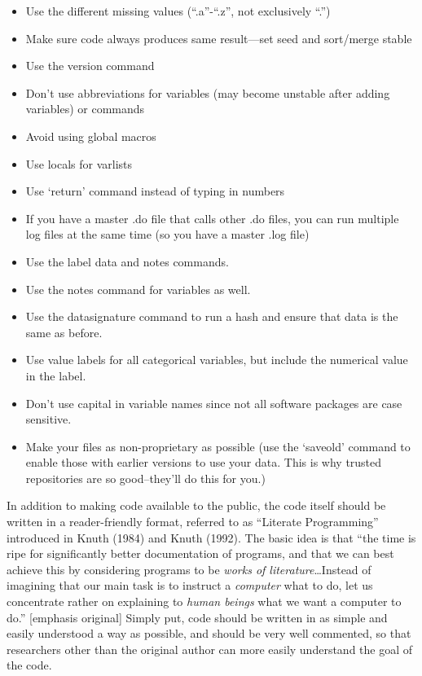\documentclass[12pt] {article}
\begin{document}
\begin{itemize}
\item
  Use the different missing values (``.a''-``.z'', not exclusively
  ``.'')
\item
  Make sure code always produces same result---set seed and sort/merge
  stable
\item
  Use the version command
\item
  Don't use abbreviations for variables (may become unstable after
  adding variables) or commands
\item
  Avoid using global macros
\item
  Use locals for varlists
\item
  Use `return' command instead of typing in numbers
\item
  If you have a master .do file that calls other .do files, you can run
  multiple log files at the same time (so you have a master .log file)
\item
  Use the label data and notes commands.
\item
  Use the notes command for variables as well.
\item
  Use the datasignature command to run a hash and ensure that data is
  the same as before.
\item
  Use value labels for all categorical variables, but include the
  numerical value in the label.
\item
  Don't use capital in variable names since not all software packages
  are case sensitive.
\item
  Make your files as non-proprietary as possible (use the `saveold'
  command to enable those with earlier versions to use your data. This
  is why trusted repositories are so good--they'll do this for you.)
\end{itemize}

In addition to making code available to the public, the code itself
should be written in a reader-friendly format, referred to as ``Literate
Programming'' introduced in Knuth (1984) and Knuth (1992). The basic
idea is that ``the time is ripe for significantly better documentation
of programs, and that we can best achieve this by considering programs
to be \emph{works of literature}\ldots{}Instead of imagining that our
main task is to instruct a \emph{computer} what to do, let us
concentrate rather on explaining to \emph{human beings} what we want a
computer to do.'' {[}emphasis original{]} Simply put, code should be
written in as simple and easily understood a way as possible, and should
be very well commented, so that researchers other than the original
author can more easily understand the goal of the code.
\end{document}
